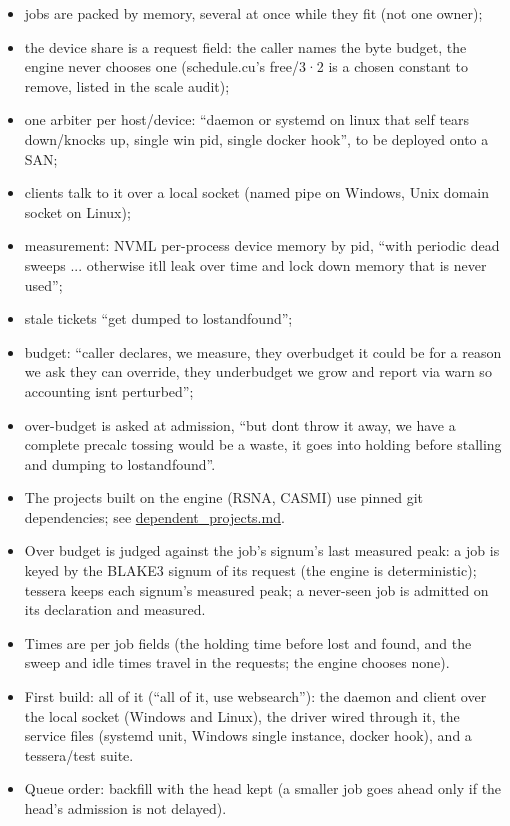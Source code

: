 \begin{itemize}
\item jobs are packed by memory, several at once while they fit (not one owner);
\item the device share is a request field: the caller names the byte budget, the engine never chooses one (schedule.cu's free/3·2 is a chosen constant to remove, listed in the scale audit);
\item one arbiter per host/device: “daemon or systemd on linux that self tears down/knocks up, single win pid, single docker hook”, to be deployed onto a SAN;
\item clients talk to it over a local socket (named pipe on Windows, Unix domain socket on Linux);
\item measurement: NVML per-process device memory by pid, “with periodic dead sweeps ... otherwise itll leak over time and lock down memory that is never used”;
\item stale tickets “get dumped to lostandfound”;
\item budget: “caller declares, we measure, they overbudget it could be for a reason we ask they can override, they underbudget we grow and report via warn so accounting isnt perturbed”;
\item over-budget is asked at admission, “but dont throw it away, we have a complete precalc tossing would be a waste, it goes into holding before stalling and dumping to lostandfound”.
\item The projects built on the engine (RSNA, CASMI) use pinned git dependencies; see \hyperref[chap:dependent-projects]{dependent\_\allowbreak{}projects.md}.
\item Over budget is judged against the job's signum's last measured peak: a job is keyed by the BLAKE3 signum of its request (the engine is deterministic); tessera keeps each signum's measured peak; a never-seen job is admitted on its declaration and measured.
\item Times are per job fields (the holding time before lost and found, and the sweep and idle times travel in the requests; the engine chooses none).
\item First build: all of it (“all of it, use websearch”): the daemon and client over the local socket (Windows and Linux), the driver wired through it, the service files (systemd unit, Windows single instance, docker hook), and a tessera/test suite.
\item Queue order: backfill with the head kept (a smaller job goes ahead only if the head's admission is not delayed).

\end{itemize}
